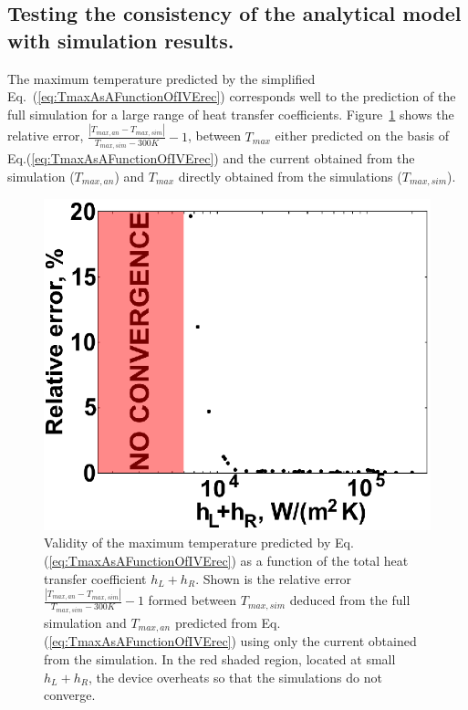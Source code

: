 \documentclass[%
9pt,
 aip,
rsi,%
 amsmath,amssymb,
preprint,%
]{revtex4-1}
\begin{document}
\subsection*{Testing the consistency of the analytical model with simulation results.}

The maximum temperature predicted by the simplified Eq.~(\ref{eq:TmaxAsAFunctionOfIVErec}) corresponds well to the prediction of the full simulation for a large range of heat transfer coefficients.
Figure~\ref{fig:connection_to_experiment} shows the relative error,
$\frac{|T_{max,an} - T_{max,sim}| }{T_{max,sim}-300K} - 1$, between $T_{max}$ either predicted on the basis of Eq.(\ref{eq:TmaxAsAFunctionOfIVErec}) and the current obtained from the simulation ($T_{max,an}$) and $T_{max}$ directly obtained from the simulations ($T_{max,sim}$).

\begin{figure}[h]
	\centering
    \includegraphics{General_plots_2.eps}
    \caption{Validity of the maximum temperature predicted by Eq.(\ref{eq:TmaxAsAFunctionOfIVErec}) as a function of the total heat transfer coefficient $h_L + h_R$. Shown is the relative error $\frac{|T_{max,an} - T_{max,sim}| }{T_{max,sim}-300K} - 1$ formed between $T_{max,sim}$ deduced from the full simulation and $T_{max,an}$ predicted from Eq.(\ref{eq:TmaxAsAFunctionOfIVErec}) using only the current obtained from the simulation. In the red shaded region, located at small $h_L + h_R$, the device overheats so that the simulations do not converge.}
    \label{fig:connection_to_experiment}
\end{figure}
\end{document}
